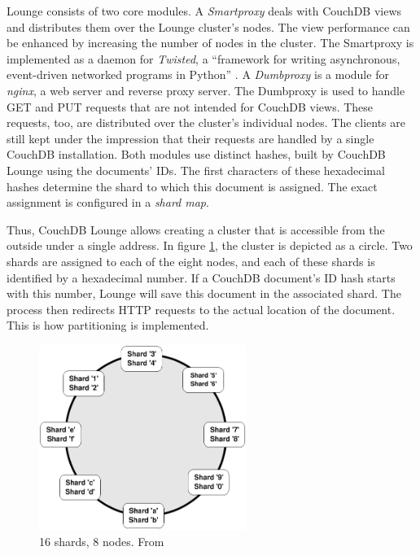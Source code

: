 Lounge consists of two core modules. A \textit{Smartproxy} deals with CouchDB views and distributes them over the Lounge cluster's nodes. The view performance can be enhanced by increasing the number of nodes in the cluster. The Smartproxy is implemented as a daemon for \textit{Twisted}, a \enquote{framework for writing asynchronous, event-driven networked programs in Python} \cite{twisted}. A \textit{Dumbproxy} is a module for \textit{nginx}, a web server and reverse proxy server. The Dumbproxy is used to handle GET and PUT requests that are not intended for CouchDB views. These requests, too, are distributed over the cluster's individual nodes. The clients are still kept under the impression that their requests are handled by a single CouchDB installation. Both modules use distinct hashes, built by CouchDB Lounge using the documents' IDs. The first characters of these hexadecimal hashes determine the shard to which this document is assigned. The exact assignment is configured in a \textit{shard map}.

Thus, CouchDB Lounge allows creating a cluster that is accessible from the outside under a single address. In figure \ref{fig:lounge-scaling1}, the cluster is depicted as a circle. Two shards are assigned to each of the eight nodes, and each of these shards is identified by a hexadecimal number. If a CouchDB document's ID hash starts with this number, Lounge will save this document in the associated shard. The process then redirects HTTP requests to the actual location of the document. This is how partitioning is implemented.

\medskip
\begin{figure}[H] 
  \begin{center}
    \includegraphics[width=0.6\textwidth]{grafik/shards1} 
  \end{center}
  \caption[16 shards, 8 nodes]{16 shards, 8 nodes. From }
  \label{fig:lounge-scaling1} 
\end{figure}

